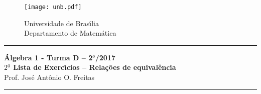 \documentclass[12pt]{article}
\newcounter{exercicios}
\newcommand{\questao}{
\addtocounter{exercicios}{1}
\noindent{\bf Exerc{\'\i}cio \arabic{exercicios}: }}
\newcommand{\n}{\mathbb{N}}
\begin{document}
\pagestyle{empty}

\begin{figure}[h]
        \begin{minipage}[c]{1.7cm}
        \texttt{[image: unb.pdf]}
        \end{minipage}%
        \hspace{0pt}
        \begin{minipage}[c]{4in}
          {Universidade de Bras{\'\i}lia} \\
          {Departamento de Matem{\'a}tica}
\end{minipage}
\end{figure}
\vspace{-1cm}\hrule

\begin{center}
{\Large\bf {\'A}lgebra 1 - Turma D -- 2$^{o}$/2017} \\ \vspace{9pt} {\large\bf
  $2^{\underline{a}}$ Lista de Exerc{\'\i}cios -- Rela\c{c}\~oes de equival{\^e}ncia}\\
\vspace{9pt} Prof. Jos{\'e} Ant{\^o}nio O. Freitas
\end{center}
\hrule

\vspace{.6cm}







\end{document}
